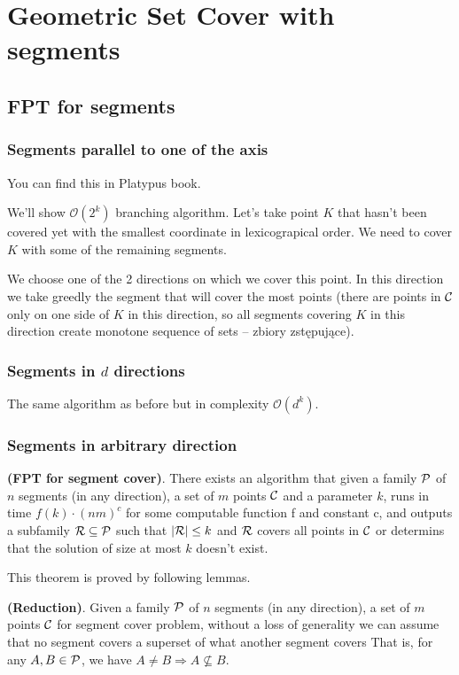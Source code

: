 \chapter{Geometric Set Cover with segments}

\section{FPT for segments}
\subsection{Segments parallel to one of the axis}
You can find this in Platypus book.

We'll show $\mathcal{O}(2^k)$ branching algorithm.
Let's take point $K$ that hasn't been covered yet with
the smallest coordinate in lexicograpical order.
We need to cover $K$ with some of the remaining segments.

We choose one of the 2 directions on which we cover this point.
In this direction we take greedly the segment that will cover
the most points (there are points in $\mathcal{C}$ only on
one side of $K$ in this direction, so all
segments covering $K$ in this direction create monotone sequence
of sets -- zbiory zstępujące).

\subsection{Segments in $d$ directions}
The same algorithm as before but in complexity $\mathcal{O}(d^k)$.

\subsection{Segments in arbitrary direction}
\begin{tw}{
	\label{segment_cover_fpt}
	\textbf{(FPT for segment cover)}.
	There exists an algorithm that given a family $\mathcal{P}$ of
	$n$ segments (in any direction),
	a set of $m$ points $\mathcal{C}$
	and a parameter $k$,
	runs in time $f(k) \cdot (nm)^c$ for some computable function f and constant c,
	and outputs a subfamily $\mathcal{R} \subseteq \mathcal{P}$
	such that $|\mathcal{R}| \le k$ and $\mathcal{R}$ covers all points in $\mathcal{C}$
	or determins that the solution of size at most $k$ doesn't exist.
}\end{tw}

This theorem is proved by following lemmas.

\begin{lemma}
   \label{fpt_reduction}
   \textbf{(Reduction)}.
   Given a family $\mathcal{P}$ of
	$n$ segments (in any direction),
	a set of $m$ points $\mathcal{C}$
	for segment cover problem,
   without a loss of generality we can assume that
   no segment covers a superset of what another segment covers
   That is, for any $A, B \in \mathcal{P}$, we have
   $A \neq B \Rightarrow A \not \subseteq B$.
\end{lemma}   
   
